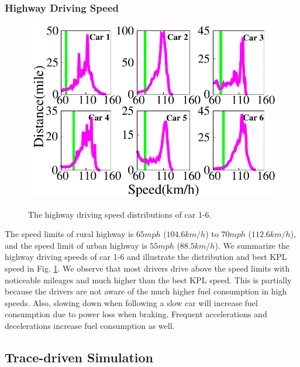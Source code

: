 \subsubsection{Highway Driving Speed}


\begin{figure}[ht]
\begin{center}
\includegraphics[width=5.0in,angle=0]{Figs/EcoDrive/evaluation/hwy_speeds.pdf}
\vspace{-0.0cm}
\caption{The highway driving speed distributions of car 1-6.}
\vspace{-0.6cm}
\label{highwayspeeds}
\end{center}
\end{figure}

The speed limits of rural highway is $65mph$ ($104.6km/h$) 
to $70mph$ ($112.6km/h$), and
the speed limit of urban highway is $55mph$ ($88.5km/h$). 
We summarize the highway driving speeds of car 1-6 
and illustrate the distribution and best KPL speed in Fig. \ref{highwayspeeds}. 
We observe that most drivers drive above the speed limits with
noticeable mileages and much higher than the best KPL speed. 
This is partially because the drivers are not aware of
the much higher fuel consumption in high speeds. 
Also, slowing down when following a slow car 
will increase fuel consumption due to power loss when braking. 
Frequent accelerations and decelerations increase
fuel consumption as well. 

\subsection{Trace-driven Simulation}


